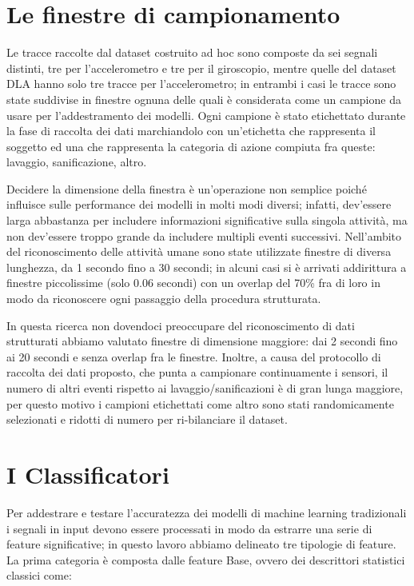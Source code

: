 \section{Le finestre di campionamento}
\label{sec:le-finestre-di-campionamento}

Le tracce raccolte dal dataset costruito ad hoc sono composte da sei segnali distinti, tre per l'accelerometro e tre per il giroscopio, mentre quelle del dataset DLA hanno solo tre tracce per l'accelerometro; in entrambi i casi le tracce sono state suddivise in finestre ognuna delle quali è considerata come un campione da usare per l'addestramento dei modelli. Ogni campione è stato etichettato durante la fase di raccolta dei dati marchiandolo con un'etichetta che rappresenta il soggetto ed una che rappresenta la categoria di azione compiuta fra queste: lavaggio, sanificazione, altro.

Decidere la dimensione della finestra è un'operazione non semplice poiché influisce sulle performance dei modelli in molti modi diversi; infatti, dev'essere larga abbastanza per includere informazioni significative sulla singola attività, ma non dev'essere troppo grande da includere multipli eventi successivi. Nell'ambito del riconoscimento delle attività umane sono state utilizzate finestre di diversa lunghezza, da 1 secondo fino a 30 secondi\cite{cheng2010active}\cite{hassan2018robust}; in alcuni casi si è arrivati addirittura a finestre piccolissime (solo 0.06 secondi) con un overlap del 70\% fra di loro in modo da riconoscere ogni passaggio della procedura strutturata.

In questa ricerca non dovendoci preoccupare del riconoscimento di dati strutturati abbiamo valutato finestre di dimensione maggiore: dai 2 secondi fino ai 20 secondi e senza overlap fra le finestre. Inoltre, a causa del protocollo di raccolta dei dati proposto, che punta a campionare continuamente i sensori, il numero di altri eventi rispetto ai lavaggio/sanificazioni è di gran lunga maggiore, per questo motivo i campioni etichettati come altro sono stati randomicamente selezionati e ridotti di numero per ri-bilanciare il dataset.

\section{I Classificatori}
\label{sec:classificatori}

Per addestrare e testare l'accuratezza dei modelli di machine learning tradizionali i segnali in input devono essere processati in modo da estrarre una serie di feature significative; in questo lavoro abbiamo delineato tre tipologie di feature. La prima categoria è composta dalle feature Base, ovvero dei descrittori statistici classici come:

